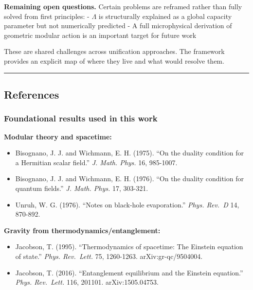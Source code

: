\documentclass[11pt,a4paper]{article}
\theoremstyle{remark}
\providecommand{\tightlist}{%
  \setlength{\itemsep}{0pt}\setlength{\parskip}{0pt}}
\begin{document}
\textbf{Remaining open questions.} Certain problems are reframed rather than fully solved from first principles:
- \(\Lambda\) is structurally explained as a global capacity parameter but not numerically predicted
- A full microphysical derivation of geometric modular action is an important target for future work

These are shared challenges across unification approaches. The framework provides an explicit map of where they live and what would resolve them.

\begin{center}\rule{0.5\linewidth}{0.5pt}\end{center}

\subsection{References}\label{references}

\subsubsection{Foundational results used in this work}\label{foundational-results-used-in-this-work}

\textbf{Modular theory and spacetime:}

\begin{itemize}
\tightlist
\item
  Bisognano, J. J. and Wichmann, E. H. (1975). ``On the duality condition for
  a Hermitian scalar field.'' \emph{J. Math. Phys.} 16, 985-1007.
\item
  Bisognano, J. J. and Wichmann, E. H. (1976). ``On the duality condition for
  quantum fields.'' \emph{J. Math. Phys.} 17, 303-321.
\item
  Unruh, W. G. (1976). ``Notes on black-hole evaporation.'' \emph{Phys. Rev.~D} 14,
  870-892.
\end{itemize}

\textbf{Gravity from thermodynamics/entanglement:}

\begin{itemize}
\tightlist
\item
  Jacobson, T. (1995). ``Thermodynamics of spacetime: The Einstein equation of
  state.'' \emph{Phys. Rev.~Lett.} 75, 1260-1263. arXiv:gr-qc/9504004.
\item
  Jacobson, T. (2016). ``Entanglement equilibrium and the Einstein equation.''
  \emph{Phys. Rev.~Lett.} 116, 201101. arXiv:1505.04753.
\end{itemize}
\end{document}

